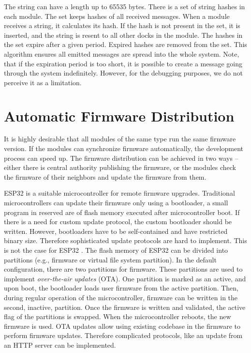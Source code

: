 \noindent The string can have a length up to 65535 bytes. There is a set of
string hashes in each module. The set keeps hashes of all received messages.
When a module receives a string, it calculates its hash. If the hash is not
present in the set, it is inserted, and the string is resent to all other docks
in the module. The hashes in the set expire after a given period. Expired hashes
are removed from the set. This algorithm ensures all emitted messages are spread
into the whole system. Note, that if the expiration period is too short, it is
possible to create a message going through the system indefinitely. However, for
the debugging purposes, we do not perceive it as a limitation.

\section{Automatic Firmware Distribution} \label{sec:firmware_distribution}

It is highly desirable that all modules of the same type run the same firmware
version. If the modules can synchronize firmware automatically, the development
process can speed up. The firmware distribution can be achieved in two ways --
either there is central authority publishing the firmware, or the modules check
the firmware of their neighbors and update the firmware from them.

ESP32 is a suitable microcontroller for remote firmware upgrades. Traditional
microcontrollers can update their firmware only using a bootloader, a small
program in reserved are of flash memory executed after microcontroller boot. If
there is a need for custom update protocol, the custom bootloader should be
written. However, bootloaders have to be self-contained and have restricted
binary size. Therefore sophisticated update protocols are hard to implement.
This is not the case for ESP32 \cite{noauthor_esp-idf_nodate}. The flash memory
of ESP32 can be divided into partitions (e.g., firmware or virtual file system
partition). In the default configuration, there are two partitions for firmware.
These partitions are used to implement \emph{over-the-air updates} (OTA). One
partition is marked as an active, and upon boot, the bootloader loads user
firmware from the active partition. Then, during regular operation of the
microcontroller, firmware can be written in the second, inactive, partition.
Once the firmware is written and validated, the active flag of the partitions is
swapped. When the microcontroller reboots, the new firmware is used. OTA updates
allow using existing codebase in the firmware to perform firmware updates.
Therefore complicated protocols, like an update from an HTTP server can be
implemented.

